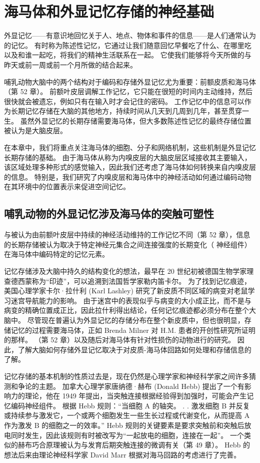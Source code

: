 \chapter{海马体和外显记忆存储的神经基础} \label{chap:chap54}

外显记忆——有意识地回忆关于人、地点、物体和事件的信息——是人们通常认为的记忆。 有时称为陈述性记忆，它通过让我们随意回忆早餐吃了什么、在哪里吃以及和谁一起吃，将我们的精神生活联系在一起。 它使我们能够将今天所做的与昨天或前一周或前一个月所做的结合起来。

哺乳动物大脑中的两个结构对于编码和存储外显记忆尤为重要：前额皮质和海马体（第 52 章）。 前额叶皮层调解工作记忆，它只能在很短的时间内主动维持，然后很快就会被遗忘，例如只有在输入时才会记住的密码。 工作记忆中的信息可以作为长期记忆存储在大脑的其他地方，持续时间从几天到几周到几年，甚至贯穿一生。 虽然外显记忆的长期存储需要海马体，但大多数陈述性记忆的最终存储位置被认为是大脑皮层。

在本章中，我们将重点关注海马体的细胞、分子和网络机制，这些机制是外显记忆长期存储的基础。 由于海马体从称为内嗅皮层的大脑皮层区域接收其主要输入，该区域处理多种形式的感觉输入，因此我们还考虑了海马体如何转换来自内嗅皮层的信息。 特别是，我们研究了内嗅皮层和海马体中的神经活动如何通过编码动物在其环境中的位置表示来促进空间记忆。


\section{哺乳动物的外显记忆涉及海马体的突触可塑性}
与被认为由前额叶皮层中持续的神经活动维持的工作记忆不同（第 52 章），信息的长期存储被认为取决于特定神经元集合之间连接强度的长期变化（ 神经组件）在海马体中编码特定的记忆元素。

记忆存储涉及大脑中持久的结构变化的想法，最早在 20 世纪初被德国生物学家理查德西蒙称为“印迹”，可以追溯到法国哲学家勒内笛卡尔。 为了找到记忆痕迹，美国心理学家卡尔·拉什利 (Karl Lashley) 研究了新皮质不同区域的病变对老鼠学习迷宫导航能力的影响。 由于迷宫中的表现似乎与病变的大小成正比，而不是与病变的精确位置成正比，因此拉什利得出结论，任何记忆痕迹都必须分布在整个大脑中。 尽管现在普遍认为外显记忆的存储分布在整个新皮质中，但也很明显，存储记忆的过程需要海马体，正如 Brenda Milner 对 H.M. 患者的开创性研究所证明的那样。 （第 52 章）以及随后对海马体有针对性损伤的动物进行的研究。 因此，了解大脑如何存储外显记忆取决于对皮质-海马体回路如何处理和存储信息的了解。

记忆存储的基本机制的性质过去是，现在仍然是心理学家和神经科学家之间许多猜测和争论的主题。 加拿大心理学家唐纳德·赫布 (Donald Hebb) 提出了一个有影响力的理论，他在 1949 年提出，当突触连接根据经验得到加强时，可能会产生记忆编码神经组件。 根据 Hebb 规则：“当细胞 A 的轴突。 . . 激发细胞 B 并反复或持续参与激发它，一个或两个细胞发生一些生长过程或代谢变化，从而提高 A 作为激发 B 的细胞之一的效率。” Hebb 规则的关键要素是要求突触前和突触后放电同时发生，因此该规则有时被改写为“一起放电的细胞，连接在一起”。 一个类似的赫布巧合原理被认为与发育后期突触连接的微调有关（第 49 章）。 Hebb 的想法后来由理论神经科学家 David Marr 根据对海马回路的考虑进行了完善。

